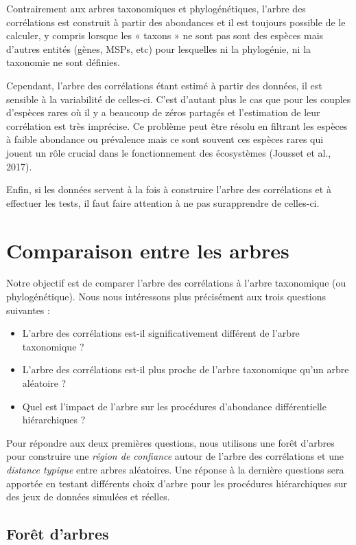 \documentclass[12pt,a4paper]{reedthesis}
\theoremstyle{definition}
\theoremstyle{definition}
\theoremstyle{definition}
\theoremstyle{remark}
\begin{document}
Contrairement aux arbres taxonomiques et phylogénétiques, l'arbre des corrélations est construit à partir des abondances et il est toujours possible de le calculer, y compris lorsque les « taxons » ne sont pas sont des espèces mais d'autres entités (gènes, MSPs, etc) pour lesquelles ni la phylogénie, ni la taxonomie ne sont définies.

Cependant, l'arbre des corrélations étant estimé à partir des données, il est sensible à la variabilité de celles-ci. C'est d'autant plus le cas que pour les couples d'espèces rares où il y a beaucoup de zéros partagés et l'estimation de leur corrélation est très imprécise. Ce problème peut être résolu en filtrant les espèces à faible abondance ou prévalence mais ce sont souvent ces espèces rares qui jouent un rôle crucial dans le fonctionnement des écosystèmes (Jousset et al., 2017).

Enfin, si les données servent à la fois à construire l'arbre des corrélations et à effectuer les tests, il faut faire attention à ne pas surapprendre de celles-ci.

\hypertarget{comparaison-entre-les-arbres}{%
\section{Comparaison entre les arbres}\label{comparaison-entre-les-arbres}}

Notre objectif est de comparer l'arbre des corrélations à l'arbre taxonomique (ou phylogénétique). Nous nous intéressons plus précisément aux trois questions suivantes :
\begin{itemize}
\item
  L'arbre des corrélations est-il significativement différent de l'arbre taxonomique ?
\item
  L'arbre des corrélations est-il plus proche de l'arbre taxonomique qu'un arbre aléatoire ?
\item
  Quel est l'impact de l'arbre sur les procédures d'abondance différentielle hiérarchiques ?
\end{itemize}
Pour répondre aux deux premières questions, nous utilisons une forêt d'arbres pour construire une \emph{région de confiance} autour de l'arbre des corrélations et une \emph{distance typique} entre arbres aléatoires. Une réponse à la dernière questions sera apportée en testant différents choix d'arbre pour les procédures hiérarchiques sur des jeux de données simulées et réelles.

\hypertarget{foruxeat-darbres}{%
\subsection{Forêt d'arbres}\label{foruxeat-darbres}}
\end{document}
